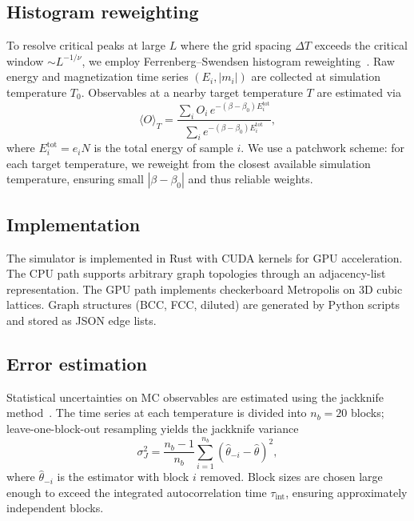 \documentclass[twocolumn,showpacs,preprintnumbers,amsmath,amssymb,pra,floatfix]{revtex4-2}
\newcommand{\avg}[1]{\langle #1 \rangle}
\begin{document}
\subsection{Histogram reweighting}

To resolve critical peaks at large $L$ where the grid spacing $\Delta T$ exceeds
the critical window $\sim L^{-1/\nu}$, we employ Ferrenberg--Swendsen
histogram reweighting~\cite{Ferrenberg1988}. Raw energy and magnetization
time series $(E_i, |m_i|)$ are collected at simulation temperature $T_0$.
Observables at a nearby target temperature $T$ are estimated via
\begin{equation}
    \avg{O}_T = \frac{\sum_i O_i \, e^{-(\beta - \beta_0) E_i^{\mathrm{tot}}}}
                     {\sum_i e^{-(\beta - \beta_0) E_i^{\mathrm{tot}}}},
\end{equation}
where $E_i^{\mathrm{tot}} = e_i N$ is the total energy of sample $i$.
We use a patchwork scheme: for each target temperature, we reweight from the
closest available simulation temperature, ensuring small $|\beta - \beta_0|$
and thus reliable weights.

\subsection{Implementation}

The simulator is implemented in Rust with CUDA kernels for GPU acceleration.
The CPU path supports arbitrary graph topologies through an adjacency-list
representation. The GPU path implements checkerboard Metropolis on 3D cubic
lattices. Graph structures (BCC, FCC, diluted) are generated by Python scripts
and stored as JSON edge lists.

\subsection{Error estimation}

Statistical uncertainties on MC observables are estimated using the jackknife
method~\cite{Efron1982}. The time series at each temperature is divided into
$n_b = 20$ blocks; leave-one-block-out resampling yields the jackknife
variance
\begin{equation}
    \sigma_J^2 = \frac{n_b - 1}{n_b} \sum_{i=1}^{n_b}
    (\hat{\theta}_{-i} - \hat{\theta})^2,
\end{equation}
where $\hat{\theta}_{-i}$ is the estimator with block $i$ removed.
Block sizes are chosen large enough to exceed the integrated autocorrelation
time $\tau_{\mathrm{int}}$, ensuring approximately independent blocks.
\end{document}
